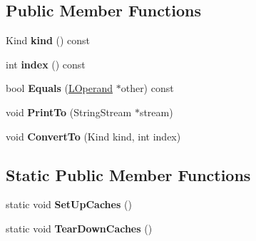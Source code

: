 \subsection*{Public Member Functions}
\begin{DoxyCompactItemize}
\item 
\hypertarget{classv8_1_1internal_1_1_l_operand_a2f1cbe5591b8438601fffcf10aae8f4a}{}Kind {\bfseries kind} () const \label{classv8_1_1internal_1_1_l_operand_a2f1cbe5591b8438601fffcf10aae8f4a}

\item 
\hypertarget{classv8_1_1internal_1_1_l_operand_a092df8bd2e8ad16f9dfa51b193dd3938}{}int {\bfseries index} () const \label{classv8_1_1internal_1_1_l_operand_a092df8bd2e8ad16f9dfa51b193dd3938}

\item 
\hypertarget{classv8_1_1internal_1_1_l_operand_affa743246d0ccd14b6cc106d548f6e21}{}bool {\bfseries Equals} (\hyperlink{classv8_1_1internal_1_1_l_operand}{L\+Operand} $\ast$other) const \label{classv8_1_1internal_1_1_l_operand_affa743246d0ccd14b6cc106d548f6e21}

\item 
\hypertarget{classv8_1_1internal_1_1_l_operand_a684de6da71cf754c32dac9653b2b63b0}{}void {\bfseries Print\+To} (String\+Stream $\ast$stream)\label{classv8_1_1internal_1_1_l_operand_a684de6da71cf754c32dac9653b2b63b0}

\item 
\hypertarget{classv8_1_1internal_1_1_l_operand_a013eb1382dbc447b932e2fea6a2180df}{}void {\bfseries Convert\+To} (Kind kind, int index)\label{classv8_1_1internal_1_1_l_operand_a013eb1382dbc447b932e2fea6a2180df}

\end{DoxyCompactItemize}
\subsection*{Static Public Member Functions}
\begin{DoxyCompactItemize}
\item 
\hypertarget{classv8_1_1internal_1_1_l_operand_aa7caa89f1f00651c0e70b732fe400c04}{}static void {\bfseries Set\+Up\+Caches} ()\label{classv8_1_1internal_1_1_l_operand_aa7caa89f1f00651c0e70b732fe400c04}

\item 
\hypertarget{classv8_1_1internal_1_1_l_operand_a859c53c343e869f24d3eae5d57e5f906}{}static void {\bfseries Tear\+Down\+Caches} ()\label{classv8_1_1internal_1_1_l_operand_a859c53c343e869f24d3eae5d57e5f906}

\end{DoxyCompactItemize}
